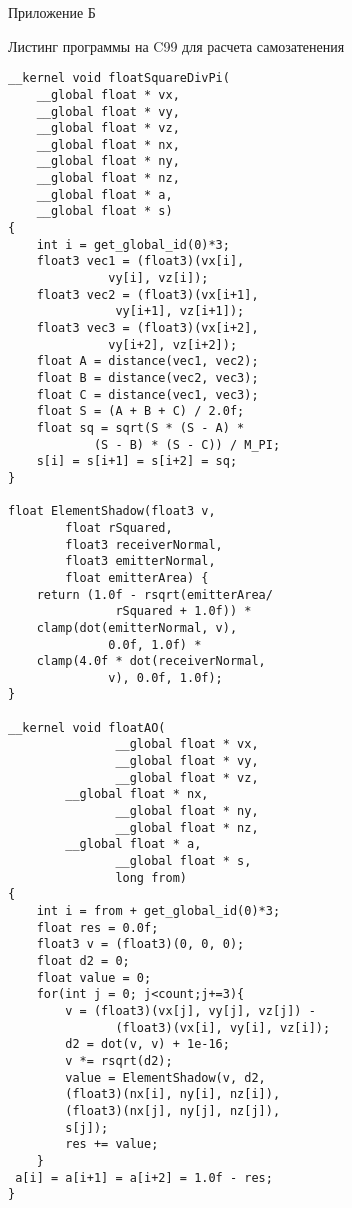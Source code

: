 \clearpage
{}
\begin{flushright}\Large{Приложение Б}\end{flushright}
\begin{center}\large{Листинг программы на C99 для расчета самозатенения}\end{center}
\begin{lstlisting}
__kernel void floatSquareDivPi(
    __global float * vx, 
    __global float * vy, 
    __global float * vz,
    __global float * nx, 
    __global float * ny, 
    __global float * nz, 
    __global float * a, 
    __global float * s)
{ 
    int i = get_global_id(0)*3;
    float3 vec1 = (float3)(vx[i], 
              vy[i], vz[i]); 
    float3 vec2 = (float3)(vx[i+1], 
               vy[i+1], vz[i+1]); 
    float3 vec3 = (float3)(vx[i+2], 
              vy[i+2], vz[i+2]); 
    float A = distance(vec1, vec2);
    float B = distance(vec2, vec3);
    float C = distance(vec1, vec3);
    float S = (A + B + C) / 2.0f;
    float sq = sqrt(S * (S - A) * 
            (S - B) * (S - C)) / M_PI;
    s[i] = s[i+1] = s[i+2] = sq;
}

float ElementShadow(float3 v, 
        float rSquared, 
        float3 receiverNormal, 
        float3 emitterNormal, 
        float emitterArea) {
    return (1.0f - rsqrt(emitterArea/
               rSquared + 1.0f)) *
    clamp(dot(emitterNormal, v), 
              0.0f, 1.0f) *
    clamp(4.0f * dot(receiverNormal, 
              v), 0.0f, 1.0f);
}

__kernel void floatAO(
               __global float * vx, 
               __global float * vy, 
               __global float * vz,
	    __global float * nx, 
               __global float * ny, 
               __global float * nz,
	    __global float * a, 
               __global float * s, 
               long from)
{ 
    int i = from + get_global_id(0)*3;
    float res = 0.0f;
    float3 v = (float3)(0, 0, 0);
    float d2 = 0;
    float value = 0;
    for(int j = 0; j<count;j+=3){
        v = (float3)(vx[j], vy[j], vz[j]) - 
               (float3)(vx[i], vy[i], vz[i]);
        d2 = dot(v, v) + 1e-16;                            
        v *= rsqrt(d2);
        value = ElementShadow(v, d2, 
        (float3)(nx[i], ny[i], nz[i]), 
        (float3)(nx[j], ny[j], nz[j]), 
        s[j]);
        res += value;
    }                        
 a[i] = a[i+1] = a[i+2] = 1.0f - res;
}
\end{lstlisting}

